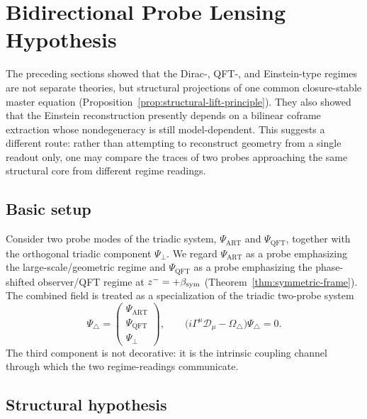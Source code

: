 \section{Bidirectional Probe Lensing Hypothesis}
\label{sec:bidirectional-probe-lensing}

The preceding sections showed that the Dirac-, QFT-, and Einstein-type
regimes are not separate theories, but structural projections of one
common closure-stable master equation
(Proposition~\ref{prop:structural-lift-principle}). They also showed
that the Einstein reconstruction presently depends on a bilinear coframe
extraction whose nondegeneracy is still model-dependent. This suggests a
different route: rather than attempting to reconstruct geometry from a
single readout only, one may compare the traces of two probes approaching
the same structural core from different regime readings.

\subsection*{Basic setup}

Consider two probe modes of the triadic system,
$\Psi_{\mathrm{ART}}$ and $\Psi_{\mathrm{QFT}}$,
together with the orthogonal triadic component $\Psi_\perp$.
We regard $\Psi_{\mathrm{ART}}$ as a probe emphasizing the
large-scale/geometric regime and $\Psi_{\mathrm{QFT}}$ as a probe
emphasizing the phase-shifted observer/QFT regime at
$z^- = +\beta_{\mathrm{sym}}$ (Theorem~\ref{thm:symmetric-frame}).
The combined field is treated as a specialization of the triadic
two-probe system
\[
  \Psi_{\triangle}
  =
  \begin{pmatrix}
    \Psi_{\mathrm{ART}}\\
    \Psi_{\mathrm{QFT}}\\
    \Psi_\perp
  \end{pmatrix},
  \qquad
  \bigl(i\Gamma^\mu\mathcal{D}_\mu - \Omega_\triangle\bigr)
  \Psi_\triangle = 0.
\]
The third component is not decorative: it is the intrinsic coupling
channel through which the two regime-readings communicate.

\subsection*{Structural hypothesis}

